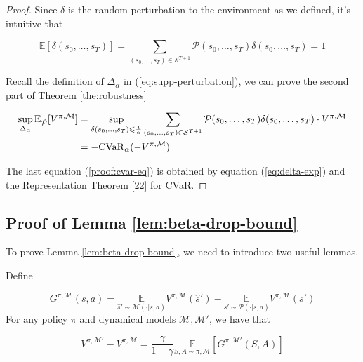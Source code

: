 \begin{proof}
Since $\delta$ is the random perturbation to the environment as we defined, it's intuitive that

\begin{equation}\label{eq:delta-exp}
    \mathbb{E}\left[\delta(s_0,\ldots,s_T)\right] = \sum_{(s_0,\ldots,s_T)\in\mathcal{S}^{T+1}}\mathcal{P}(s_0,\ldots,s_T)\delta(s_0,\ldots,s_T) = 1
\end{equation}

Recall the definition of $\Delta_\alpha$ in (\ref{eq:supp-perturbation}), we can prove the second part of Theorem \ref{the:robustness}

\begin{align}
    \sup\limits_{\Delta_\alpha}\mathbb{E}_{\hat{\mathcal{P}}}[V^{\pi,\mathcal{M}}] &= \sup\limits_{\delta(s_0,\ldots,s_T)\leq\frac{1}{\alpha}}\sum_{(s_0,\ldots,s_T)\in\mathcal{S}^{T+1}}\mathcal{P}(s_0,\ldots,s_T)\delta(s_0,\ldots,s_T)\cdot V^{\pi,\mathcal{M}}\notag\\
    &=-\mathrm{CVaR}_\alpha(-V^{\pi,\mathcal{M}})\label{proof:cvar-eq}
\end{align}

The last equation (\ref{proof:cvar-eq}) is obtained by equation (\ref{eq:delta-exp}) and the Representation Theorem [22] for CVaR.

\end{proof}

\subsection{Proof of Lemma \ref{lem:beta-drop-bound}}

To prove Lemma \ref{lem:beta-drop-bound}, we need to introduce two useful lemmas.

\begin{lemma}\label{lem:proof-for-lem41}

Define

\begin{equation}\label{def:G-sa}
G^{\pi,\mathcal{M}}(s,a)=\underset{\hat{s}'\sim\mathcal{M}(\cdot|s,a)}{\mathbb{E}}{{V}^{\pi,\mathcal{M}}}(\hat{s}') - \underset{s'\sim\mathcal{P}(\cdot|s,a)}{\mathbb{E}}{{V}^{\pi,\mathcal{M}}}(s')
\end{equation}
For any policy $\pi$ and dynamical models $\mathcal{M},\mathcal{M}'$, we have that

\begin{equation}
{V}^{\pi,\mathcal{M}'} - {V}^{\pi,\mathcal{M}} = \frac{\gamma}{1-\gamma}\underset{S,A\sim\pi,\mathcal{M}}{\mathbb{E}}\left[G^{\pi,\mathcal{M}'}(S,A)\right]
\end{equation}

\end{lemma}

